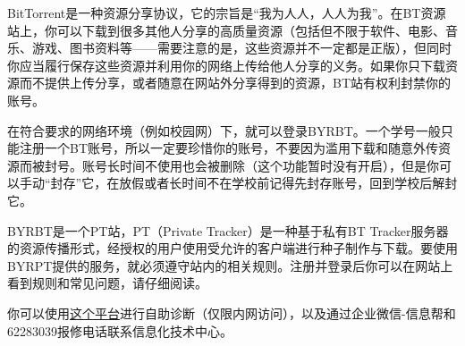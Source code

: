 
BitTorrent是一种资源分享协议，它的宗旨是“我为人人，人人为我”。在BT资源站上，你可以下载到很多其他人分享的高质量资源（包括但不限于软件、电影、音乐、游戏、图书资料等——需要注意的是，这些资源并不一定都是正版），但同时你应当履行保存这些资源并利用你的网络上传给他人分享的义务。如果你只下载资源而不提供上传分享，或者随意在网站外分享得到的资源，BT站有权利封禁你的账号。

在符合要求的网络环境（例如校园网）下，就可以登录BYRBT。一个学号一般只能注册一个BT账号，所以一定要珍惜你的账号，不要因为滥用下载和随意外传资源而被封号。账号长时间不使用也会被删除（这个功能暂时没有开启），但是你可以手动“封存”它，在放假或者长时间不在学校前记得先封存账号，回到学校后解封它。

BYRBT是一个PT站，PT（Private Tracker）是一种基于私有BT Tracker服务器的资源传播形式，经授权的用户使用受允许的客户端进行种子制作与下载。要使用BYRPT提供的服务，就必须遵守站内的相关规则。注册并登录后你可以在网站上看到规则和常见问题，请仔细阅读。


你可以使用\href{https://buptnet.icu}{这个平台}进行自助诊断（仅限内网访问），以及通过企业微信-信息帮和62283039报修电话联系信息化技术中心。
